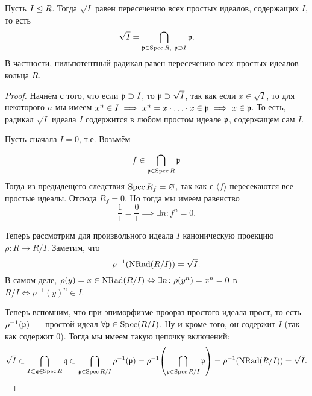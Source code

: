 	\begin{theorem} 
		Пусть $I \trianglelefteq R$. Тогда $\sqrt{I}$ равен пересечению всех простых идеалов, содержащих $I$, то есть 
		\[
			\sqrt{I} = \bigcap_{\mathfrak{p} \in \operatorname{Spec}{R}, \ \mathfrak{p} \supset I} \mathfrak{p}. 
		\]
		В частности, нильпотентный радикал равен пересечению всех простых идеалов кольца $R$.
	
	\end{theorem}
	\begin{proof}
		Начнём с того, что если $\mathfrak{p} \supset I$, то $\mathfrak{p} \supset \sqrt{I}$, так как если $x \in \sqrt{I}$, то для некоторого $n$ мы имеем $x^n \in I \implies x^n = x \cdot \ldots \cdot x \in \mathfrak{p} \implies x \in \mathfrak{p}$. То есть, радикал $\sqrt{I}$ идеала  $I$ содержится в любом простом идеале $\mathfrak{p}$, содержащем сам $I$.

		Пусть сначала $I = 0$, т.е. Возьмём 

		\[
		 	f \in \bigcap_{\mathfrak{p} \in \operatorname{Spec}{R}} \mathfrak{p} 
		 \]
		  Тогда из предыдещего следствия $\operatorname{Spec}{R_{f}} = \varnothing$, так как с $\langle f \rangle $ пересекаются все простые идеалы.  Отсюда $R_{f} = 0$. Но тогда мы имеем равенство 
		  \[
		  	\frac{1}{1} = \frac{0}{1} \implies \exists n \colon f^n = 0. 
		  \]

		  Теперь рассмотрим для произвольного идеала $I$ каноническую проекцию $\rho \colon R \to R/I$. Заметим, что 
		  \[
		  	 \rho^{-1}\lr*{\NRad(R/I)} = \sqrt{I}.
		  \]
		  В самом деле, $\rho(y) = x \in \operatorname{NRad}(R/I) \Leftrightarrow \exists n \colon \rho(y^n) = x^n = 0$ в  $R/I \Leftrightarrow \rho^{-1}(y)^n \in I$.

		  Теперь вспомним, что при эпиморфизме проораз простого идеала прост, то есть $\rho^{-1}(\mathfrak{p})$~--- простой идеал $\forall \mathfrak{p} \in \operatorname{Spec}(R/I)$. Ну и кроме того, он содержит $I$ (так как содержит 0). Тогда мы имеем такую цепочку включений: 
		  \[
		   	\sqrt{I} \subset \bigcap_{I \subset \fq \in \Spec{R}} \fq \subset \bigcap_{\fp \in \Spec{R/I}} \rho^{-1}(\fp) = \rho^{-1}\lr*{\bigcap_{\fp \in \Spec{R/I}} \fp } = \rho^{-1}\lr*{\NRad\lr*{R/I}} = \sqrt{I}.
		   \] 
	\end{proof}

	

	






